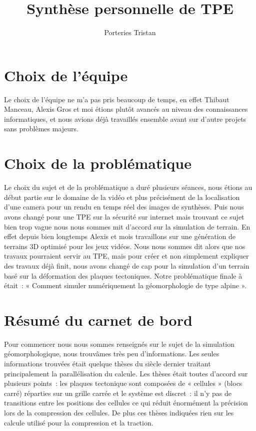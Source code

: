 \documentclass[a4paper,11pt]{article}
\title{Synthèse personnelle de TPE}
\author{Porteries Tristan}
\begin{document}
\maketitle

\tableofcontents

\begin{abstract}

\end{abstract}

\section{Choix de l'équipe}

Le choix de l'équipe ne m'a pas pris beaucoup de temps, en effet Thibaut Manceau, Alexis Gros et moi étions plutôt avancés au niveau des connaissances informatiques, et nous avions déjà travaillés ensemble avant sur d'autre projets sans problèmes majeurs.

\section{Choix de la problématique}

Le choix du sujet et de la problématique a duré plusieurs séances, nous étions au début partie sur le domaine de la vidéo et plus précisément de la localisation d'une camera pour un rendu en temps réel des images de synthèses.
Puis nous avons changé pour une TPE sur la sécurité sur internet mais trouvant ce sujet bien trop vague nous nous sommes mit d'accord sur la simulation de terrain.
En effet depuis bien longtemps Alexis et mois travaillons sur une génération de terrains 3D optimisé pour les jeux vidéos.
Nous nous sommes dit alors que nos travaux pourraient servir au TPE, mais pour créer et non simplement expliquer des travaux déjà finit, nous avons changé de cap pour la simulation d'un terrain basé sur la déformation des plaques tectoniques.
Notre problématique finale à était~: « Comment simuler numériquement la géomorphologie de type alpine ».

\section{Résumé du carnet de bord}

Pour commencer nous nous sommes renseignés sur le sujet de la simulation géomorphologique, nous trouvâmes très peu d'informations.
Les seules informations trouvées était quelque thèses du siècle dernier traitant principalement la parallélisation du calcule.
Les thèses était toutes d'accord sur plusieurs points~: les plaques tectonique sont composées de « cellules » (blocs carré) réparties sur un grille carrée et le système est discret~: il n'y pas de transitions entre les positions des cellules ce qui réduit énormément la précision lors de la compression des cellules.
De plus ces thèses indiquées rien sur les calcule utilisé pour la compression et la traction.
\end{document}
